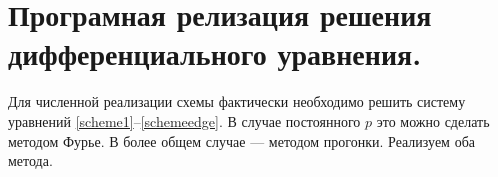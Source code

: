 \documentclass[14pt,a4paper]{extarticle}
\newcommand{\1}{\mathbbm{1}}
\begin{document}
\section{Програмная релизация решения дифференциального уравнения.}
Для численной реализации схемы фактически необходимо решить систему уравнений \eqref{scheme1}--\eqref{schemeedge}. 
В случае постоянного $p$ это можно сделать методом Фурье. В более общем случае --- методом прогонки. Реализуем оба метода.

\end{document}

